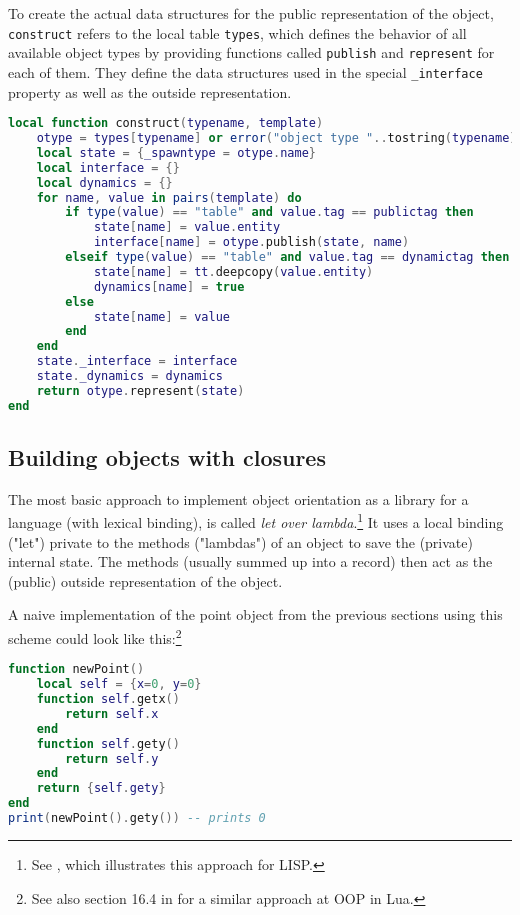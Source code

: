 To create the actual data structures for the public representation of the object, \texttt{construct} refers to the local table \texttt{types}, which defines the behavior of all available object types by providing functions called \texttt{publish} and \texttt{represent} for each of them. They define the data structures used in the special \texttt{\_interface} property as well as the outside representation.

\begin{lstlisting}[language=lua, caption={The definition of \texttt{construct} from \texttt{"oo.lua"}}, label=lst:construct, name=lst:construct]
local function construct(typename, template)
    otype = types[typename] or error("object type "..tostring(typename).." doesn't exist")
    local state = {_spawntype = otype.name}
    local interface = {}
    local dynamics = {}
    for name, value in pairs(template) do
        if type(value) == "table" and value.tag == publictag then
            state[name] = value.entity
            interface[name] = otype.publish(state, name)
        elseif type(value) == "table" and value.tag == dynamictag then 
            state[name] = tt.deepcopy(value.entity)
            dynamics[name] = true
        else
            state[name] = value
        end
    end
    state._interface = interface
    state._dynamics = dynamics
    return otype.represent(state)
end
\end{lstlisting}


\subsection{Building objects with closures}

The most basic approach to implement object orientation as a library for a language (with lexical binding), is called \emph{let over lambda}.\footnote{See \cite{Hoyte2008}, which illustrates this approach for LISP.} It uses a local binding ("let") private to the methods ("lambdas") of an object to save the (private) internal state. The methods (usually summed up into a record) then act as the (public) outside representation of the object.

A naive implementation of the point object from the previous sections using this scheme could look like this:\footnote{See also section 16.4 in \cite{Ierusalimschy2006} for a similar approach at OOP in Lua.}

\begin{lstlisting}[language=lua, caption={Possible implementation of a point object using closures}, label=lst:lol, name=lst:lol]
function newPoint()
	local self = {x=0, y=0}
	function self.getx()
		return self.x
	end
	function self.gety()
		return self.y
	end
	return {self.gety}
end
print(newPoint().gety()) -- prints 0
\end{lstlisting}


